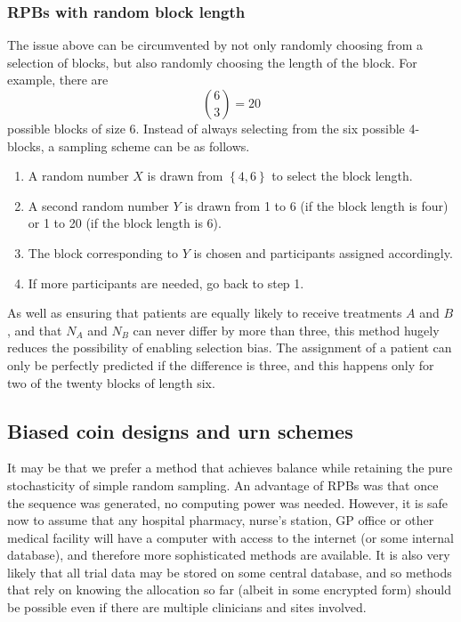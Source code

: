 \documentclass[
  openany]{book}
\providecommand{\tightlist}{%
  \setlength{\itemsep}{0pt}\setlength{\parskip}{0pt}}
\theoremstyle{definition}
\theoremstyle{definition}
\theoremstyle{definition}
\theoremstyle{definition}
\theoremstyle{remark}
\begin{document}
\subsubsection{RPBs with random block length}\label{rpbs-with-random-block-length}

The issue above can be circumvented by not only randomly choosing from a selection of blocks, but also randomly choosing the length of the block. For example, there are
\[ \binom{6}{3} = 20\]
possible blocks of size 6. Instead of always selecting from the six possible 4-blocks, a sampling scheme can be as follows.

\begin{enumerate}
\def\labelenumi{\arabic{enumi}.}
\tightlist
\item
  A random number \(X\) is drawn from \(\left\lbrace 4,6\right\rbrace\) to select the block length.
\item
  A second random number \(Y\) is drawn from 1 to 6 (if the block length is four) or 1 to 20 (if the block length is 6).
\item
  The block corresponding to \(Y\) is chosen and participants assigned accordingly.
\item
  If more participants are needed, go back to step 1.
\end{enumerate}

As well as ensuring that patients are equally likely to receive treatments \(A\) and \(B\), and that \(N_A\) and \(N_B\) can never differ by more than three, this method hugely reduces the possibility of enabling selection bias. The assignment of a patient can only be perfectly predicted if the difference is three, and this happens only for two of the twenty blocks of length six.

\subsection{Biased coin designs and urn schemes}\label{bcurn}

It may be that we prefer a method that achieves balance while retaining the pure stochasticity of simple random sampling. An advantage of RPBs was that once the sequence was generated, no computing power was needed. However, it is safe now to assume that any hospital pharmacy, nurse's station, GP office or other medical facility will have a computer with access to the internet (or some internal database), and therefore more sophisticated methods are available. It is also very likely that all trial data may be stored on some central database, and so methods that rely on knowing the allocation so far (albeit in some encrypted form) should be possible even if there are multiple clinicians and sites involved.
\end{document}
